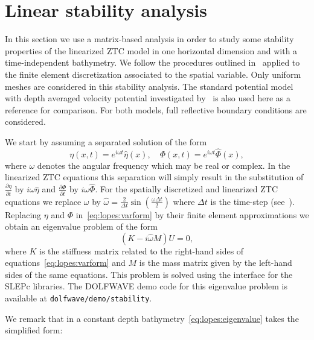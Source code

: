 
\section{Linear stability analysis}\label{sec:lopes:linearanalysis}
In this section we use a matrix-based analysis in order to
study some stability properties of the linearized ZTC model
in one horizontal dimension and with a time-independent
bathymetry. We follow the procedures outlined
in~\cite{LovholtPedersen2009} applied to the finite element
discretization associated to the spatial variable.  Only
uniform meshes are considered in this stability analysis.
The standard potential model with depth averaged velocity
potential investigated by~\cite{LovholtPedersen2009} is also
used here as a reference for comparison.  For both models,
full reflective boundary conditions are considered.

We start by assuming  a separated  solution of the form
\begin{equation}\label{eq:lopes:exp}
\eta(x,t)=e^{i\omega t}\hat\eta(x),\quad
\Phi(x,t)=e^{i\omega t}\hat\Phi(x),
\end{equation}
where  $\omega$ denotes the  angular frequency which
may be real or complex.
In the linearized ZTC equations this separation will simply
result in the substitution of $\frac{\partial \eta}{\partial
t}$ by $i\omega \hat\eta$ and $\frac{\partial \Phi}{\partial
t}$ by $i\omega \hat\Phi$.
For the spatially discretized and linearized ZTC equations
we replace $\omega$ by $\hat\omega=\frac{2}{\Delta
t}\sin\left(\frac{\omega \Delta t}{2}\right)$ where $\Delta
t$ is the time-step (see~\cite{LovholtPedersen2009}).
Replacing $\eta$ and $\Phi$ in~\eqref{eq:lopes:varform} by
their finite element approximations
 we obtain an eigenvalue problem of the form
\begin{equation}\label{eq:lopes:eigenvalue}
(K- i\hat\omega M) U=0,
\end{equation}
where $K$ is the stiffness matrix related to the right-hand
sides of equations~\eqref{eq:lopes:varform} and $M$ is the mass
matrix given by the left-hand sides of the same equations.
This problem is solved using the \dolfin interface for the
SLEPc libraries.  The DOLFWAVE demo code for this eigenvalue problem
is available at {\tt dolfwave/demo/stability}.

We remark that in  a constant depth
bathymetry~\eqref{eq:lopes:eigenvalue}
takes the simplified form:

